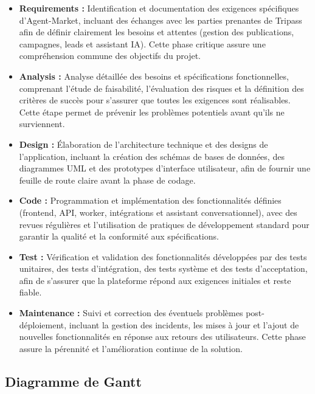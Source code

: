 \documentclass[12pt,a4paper]{report}
\numberwithin{figure}{chapter}
\numberwithin{table}{chapter}
\begin{document}
\begin{itemize}[leftmargin=2em,itemsep=6pt]

\item \textbf{Requirements :} Identification et documentation des exigences spécifiques d’Agent-Market, incluant des échanges avec les parties prenantes de Tripass afin de définir clairement les besoins et attentes (gestion des publications, campagnes, leads et assistant IA). Cette phase critique assure une compréhension commune des objectifs du projet.

\item \textbf{Analysis :} Analyse détaillée des besoins et spécifications fonctionnelles, comprenant l’étude de faisabilité, l’évaluation des risques et la définition des critères de succès pour s’assurer que toutes les exigences sont réalisables. Cette étape permet de prévenir les problèmes potentiels avant qu’ils ne surviennent.

\item \textbf{Design :} Élaboration de l’architecture technique et des designs de l’application, incluant la création des schémas de bases de données, des diagrammes UML et des prototypes d’interface utilisateur, afin de fournir une feuille de route claire avant la phase de codage.

\item \textbf{Code :} Programmation et implémentation des fonctionnalités définies (frontend, API, worker, intégrations et assistant conversationnel), avec des revues régulières et l’utilisation de pratiques de développement standard pour garantir la qualité et la conformité aux spécifications.

\item \textbf{Test :} Vérification et validation des fonctionnalités développées par des tests unitaires, des tests d’intégration, des tests système et des tests d’acceptation, afin de s’assurer que la plateforme répond aux exigences initiales et reste fiable.

\item \textbf{Maintenance :} Suivi et correction des éventuels problèmes post-déploiement, incluant la gestion des incidents, les mises à jour et l’ajout de nouvelles fonctionnalités en réponse aux retours des utilisateurs. Cette phase assure la pérennité et l’amélioration continue de la solution.

\end{itemize}

\subsection{Diagramme de Gantt}
\end{document}

